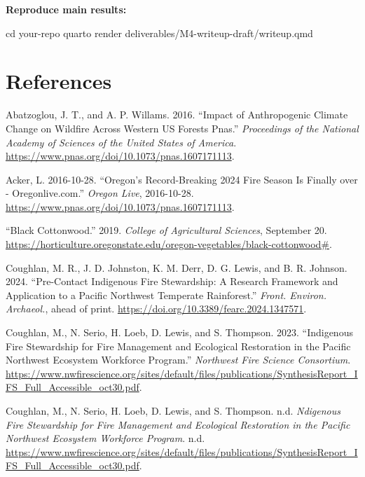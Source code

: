 \documentclass[
  letterpaper,
  DIV=11,
  numbers=noendperiod]{scrartcl}
\newenvironment{Shaded}{\begin{snugshade}}{\end{snugshade}}
\newcommand{\BuiltInTok}[1]{\textcolor[rgb]{0.00,0.23,0.31}{#1}}
\newcommand{\ExtensionTok}[1]{\textcolor[rgb]{0.00,0.23,0.31}{#1}}
\newcommand{\NormalTok}[1]{\textcolor[rgb]{0.00,0.23,0.31}{#1}}
\newlength{\cslhangindent}
\newenvironment{CSLReferences}[2] %
 {\begin{list}{}{%
  \setlength{\itemindent}{0pt}
  \setlength{\leftmargin}{0pt}
  \setlength{\parsep}{0pt}
  \ifodd #1
   \setlength{\leftmargin}{\cslhangindent}
   \setlength{\itemindent}{-1\cslhangindent}
  \fi
  \setlength{\itemsep}{#2\baselineskip}}}
 {\end{list}}
\begin{document}
\textbf{Reproduce main results:}

\begin{Shaded}
\begin{Highlighting}[]
\BuiltInTok{cd}\NormalTok{ your{-}repo}
\ExtensionTok{quarto}\NormalTok{ render deliverables/M4{-}writeup{-}draft/writeup.qmd}
\end{Highlighting}
\end{Shaded}

\section{References}\label{references}

\protect{}\label{refs}
\begin{CSLReferences}{1}{1}
Abatzoglou, J. T., and A. P. Willams. 2016. {``Impact of Anthropogenic
Climate Change on Wildfire Across Western US Forests \textbar{} Pnas.''}
\emph{Proceedings of the National Academy of Sciences of the United
States of America}.
\url{https://www.pnas.org/doi/10.1073/pnas.1607171113}.

Acker, L. 2016-10-28. {``Oregon's Record-Breaking 2024 Fire Season Is
Finally over - Oregonlive.com.''} \emph{Oregon Live}, 2016-10-28.
\url{https://www.pnas.org/doi/10.1073/pnas.1607171113}.

{``Black Cottonwood.''} 2019. \emph{College of Agricultural Sciences},
September 20.
\url{https://horticulture.oregonstate.edu/oregon-vegetables/black-cottonwood\#}.

Coughlan, M. R., J. D. Johnston, K. M. Derr, D. G. Lewis, and B. R.
Johnson. 2024. {``Pre-Contact Indigenous Fire Stewardship: A Research
Framework and Application to a Pacific Northwest Temperate
Rainforest.''} \emph{Front. Environ. Archaeol.}, ahead of print.
\url{https://doi.org/10.3389/fearc.2024.1347571}.

Coughlan, M., N. Serio, H. Loeb, D. Lewis, and S. Thompson. 2023.
{``Indigenous Fire Stewardship for Fire Management and Ecological
Restoration in the Pacific Northwest Ecosystem Workforce Program.''}
\emph{Northwest Fire Science Consortium}.
\url{https://www.nwfirescience.org/sites/default/files/publications/SynthesisReport_IFS_Full_Accessible_oct30.pdf}.

Coughlan, M., N. Serio, H. Loeb, D. Lewis, and S. Thompson. n.d.
\emph{Ndigenous Fire Stewardship for Fire Management and Ecological
Restoration in the Pacific Northwest Ecosystem Workforce Program}. n.d.
\url{https://www.nwfirescience.org/sites/default/files/publications/SynthesisReport_IFS_Full_Accessible_oct30.pdf}.


\end{CSLReferences}
\end{document}
